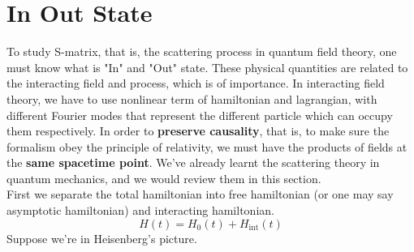 \documentclass[12pt]{article}
\numberwithin{equation}{section}
\begin{document}
\section{In Out State}
To study S-matrix, that is, the scattering process in quantum field theory, one must know what is "In" and "Out" state.
These physical quantities are related to the interacting field and process, which is of importance.
In interacting field theory, we have to use nonlinear term of hamiltonian and lagrangian, with different Fourier modes that represent the different particle which can occupy them respectively.
In order to \textbf{preserve causality}, that is, to make sure the formalism obey the principle of relativity, we must have the products of fields at the \textbf{same spacetime point}.
We've already learnt the scattering theory in quantum mechanics, and we would review them in this section.
\\\indent First we separate the total hamiltonian into free hamiltonian (or one may say asymptotic hamiltonian) and interacting hamiltonian.
\begin{equation}
    H(t) = H_{0}(t) + H_{\text{int}}(t)
\end{equation}
Suppose we're in Heisenberg's picture.
\end{document}
